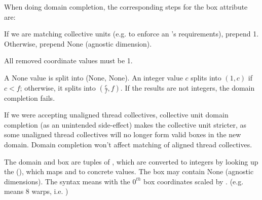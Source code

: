 \filbreak
{}

When doing domain completion, the corresponding steps for the box attribute are:

\filbreak
{} If we are matching collective units (e.g. to enforce an 's requirements), prepend 1.
Otherwise, prepend None (agnostic dimension).

\filbreak
{} All removed coordinate values must be 1.

\filbreak
{} A None value is split into (None, None).
An integer value $c$ splits into $(1, c)$ if $c < f$; otherwise, it splits into $(\frac{c}{f}, f)$.
If the results are not integers, the domain completion fails.

\filbreak
If we were accepting unaligned thread collectives, collective unit domain completion (as an unintended side-effect) makes the collective unit stricter, as some unaligned thread collectives will no longer form valid boxes in the new domain.
Domain completion won't affect matching of aligned thread collectives.

\filbreak
{}

The domain and box are tuples of , which are converted to integers by looking up the  (), which maps  and  to concrete values.
The box may contain None (agnostic dimensions).
The syntax  means  with the $0^{th}$ box coordinates scaled by .
(e.g.  means 8 warps, i.e. )

\filbreak
{}

